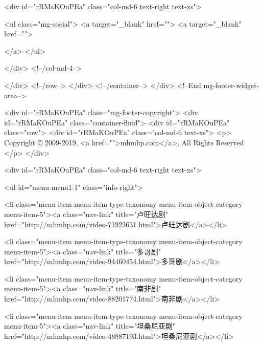                     <div id="rRMaKOuPEa"  class="col-md-6 text-right text-xs">

                        <ul class="mg-social">
                            <a target="_blank" href="">
                                <a target="_blank" href="">

                                </a>
                        </ul>


                    </div>
                    <!--/col-md-4-->

                </div>
                <!--/row-->
            </div>
            <!--/container-->
        </div>
        <!--End mg-footer-widget-area-->

        <div id="rRMaKOuPEa"  class="mg-footer-copyright">
            <div id="rRMaKOuPEa"  class="container-fluid">
                <div id="rRMaKOuPEa"  class="row">
                    <div id="rRMaKOuPEa"  class="col-md-6 text-xs">
                        <p>
                            Copyright © 2009-2019, <a href="">mhmhp.com</a>, All Rights Reserved   
                        </p>
                    </div>



                    <div id="rRMaKOuPEa"  class="col-md-6 text-right text-xs">
                        
                        <ul id="menu-menu1-1" class="info-right">
                            
                            <li class="menu-item menu-item-type-taxonomy menu-item-object-category menu-item-5"><a class="nav-link" title="卢旺达剧" href="http://mhmhp.com/video-71923631.html">卢旺达剧</a></li>
                            
                            <li class="menu-item menu-item-type-taxonomy menu-item-object-category menu-item-5"><a class="nav-link" title="多哥剧" href="http://mhmhp.com/video-94460454.html">多哥剧</a></li>
                            
                            <li class="menu-item menu-item-type-taxonomy menu-item-object-category menu-item-5"><a class="nav-link" title="南非剧" href="http://mhmhp.com/video-88201774.html">南非剧</a></li>
                            
                            <li class="menu-item menu-item-type-taxonomy menu-item-object-category menu-item-5"><a class="nav-link" title="坦桑尼亚剧" href="http://mhmhp.com/video-48887193.html">坦桑尼亚剧</a></li>
                            
